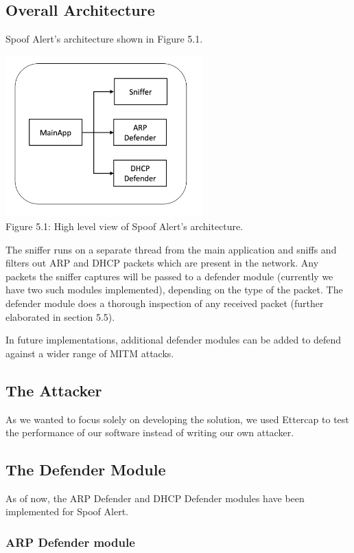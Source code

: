 \documentclass{acm_proc_article-sp}
\begin{document}
\subsection{Overall Architecture}
Spoof Alert's architecture shown in Figure 5.1. 

\includegraphics[width=3in]{architecture01.png} \\
Figure 5.1: High level view of Spoof Alert's architecture.

The sniffer runs on a separate thread from the main application and sniffs and filters out ARP and DHCP packets which are present in the network. Any packets the sniffer captures will be passed to a defender module (currently we have two such modules implemented), depending on the type of the packet. The defender module does a thorough inspection of any received packet (further elaborated in section 5.5). 

In future implementations, additional defender modules can be added to defend against a wider range of MITM attacks.

\subsection{The Attacker}

As we wanted to focus solely on developing the solution, we used Ettercap to test the performance of our software instead of writing our own attacker.  

\subsection{The Defender Module}

As of now, the ARP Defender and DHCP Defender modules have been implemented for Spoof Alert.

\subsubsection{ARP Defender module}
\end{document}
